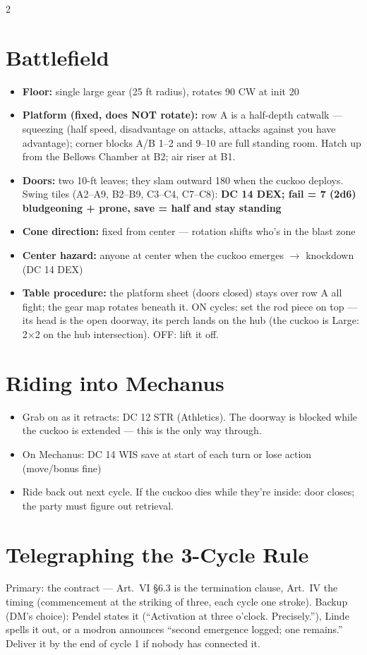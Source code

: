 \documentclass[10pt,letterpaper]{article}
\begin{document}
\begin{multicols}{2}
\section*{Battlefield}
\begin{itemize}
\item \textbf{Floor:} single large gear (25 ft radius), rotates 90\textdegree{} CW at init 20
\item \textbf{Platform (fixed, does NOT rotate):} row A is a half-depth catwalk --- squeezing (half speed, disadvantage on attacks, attacks against you have advantage); corner blocks A/B 1--2 and 9--10 are full standing room. Hatch up from the Bellows Chamber at B2; air riser at B1.
\item \textbf{Doors:} two 10-ft leaves; they slam outward 180\textdegree{} when the cuckoo deploys. Swing tiles (A2--A9, B2--B9, C3--C4, C7--C8): \textbf{DC 14 DEX; fail = 7 (2d6) bludgeoning + prone, save = half and stay standing}
\item \textbf{Cone direction:} fixed from center --- rotation shifts who's in the blast zone
\item \textbf{Center hazard:} anyone at center when the cuckoo emerges $\to$ knockdown (DC 14 DEX)
\item \textbf{Table procedure:} the platform sheet (doors closed) stays over row A all fight; the gear map rotates beneath it. ON cycles: set the rod piece on top --- its head is the open doorway, its perch lands on the hub (the cuckoo is Large: 2$\times$2 on the hub intersection). OFF: lift it off.
\end{itemize}

\section*{Riding into Mechanus}
\begin{itemize}
\item Grab on as it retracts: DC 12 STR (Athletics). The doorway is blocked while the cuckoo is extended --- this is the only way through.
\item On Mechanus: DC 14 WIS save at start of each turn or lose action (move/bonus fine)
\item Ride back out next cycle. If the cuckoo dies while they're inside: door closes; the party must figure out retrieval.
\end{itemize}

\section*{Telegraphing the 3-Cycle Rule}
Primary: the contract --- Art.\ VI \S6.3 is the termination clause, Art.\ IV the timing (commencement at the striking of three, each cycle one stroke). Backup (DM's choice): Pendel states it (``Activation at three o'clock. Precisely.''), Linde spells it out, or a modron announces ``second emergence logged; one remains.'' Deliver it by the end of cycle 1 if nobody has connected it.


\end{multicols}
\end{document}
